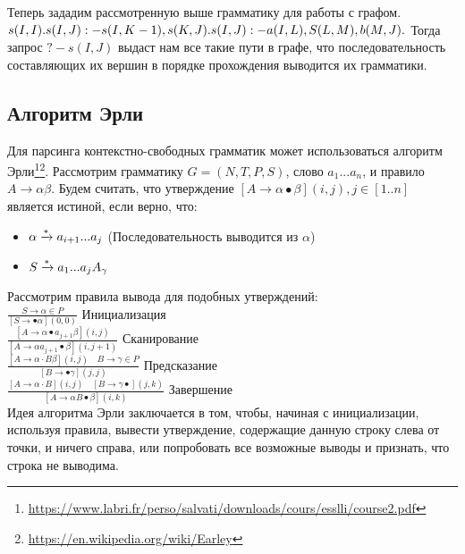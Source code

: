 Теперь зададим рассмотренную выше грамматику для работы с графом.\\
$s(I, I).\\
s(I,J) :- s(I, K-1),s(K, J).\\
s(I, J):- a(I, L),S(L,M),b(M,J).\\$
Тогда запрос $?-s(I, J)$ выдаст нам все такие пути в графе, что последовательность составляющих их вершин в порядке прохождения выводится их грамматики.\\

\subsection{Алгоритм Эрли}
Для парсинга контекстно-свободных грамматик может использоваться алгоритм Эрли\footnote{\url{https://www.labri.fr/perso/salvati/downloads/cours/esslli/course2.pdf}}\footnote{\url{https://en.wikipedia.org/wiki/Earley}}.
Рассмотрим грамматику $G=(N,T,P,S)$, слово $a_1...a_n$,
и правило $A \rightarrow \alpha\beta$. Будем считать, что утверждение
$[A\rightarrow \alpha \bullet \beta](i,j), j \in [1..n]$ является истиной, если верно, что:
\begin{itemize}
	\item $\alpha \xrightarrow{\smash{*}} a_{i+1}...a_j$ (Последовательность выводится из $\alpha$)
	\item $S \xrightarrow{\smash{*}} a_1...a_jA_\gamma$ 
\end{itemize}


Рассмотрим правила вывода для подобных утверждений:\\

$\frac{S \rightarrow \alpha \in P}{[S \rightarrow \bullet \alpha](0,0)}$ Инициализация\\

$\frac{\left[A \rightarrow \alpha \bullet a_{j+1} \beta\right](i, j)}{\left[A \rightarrow \alpha a_{j+1} \bullet \beta\right](i, j+1)}$ Сканирование\\

$\frac{[A \rightarrow \alpha \cdot B \beta](i, j) \quad B \rightarrow \gamma \in P}{[B \rightarrow \bullet \gamma](j, j)}$ Предсказание\\

$\frac{[A \rightarrow \alpha \cdot B](i, j) \quad[B \rightarrow \gamma \bullet](j, k)}{[A \rightarrow \alpha B \bullet \beta](i, k)}$ Завершение\\

Идея алгоритма Эрли заключается в том, чтобы, начиная с инициализации, используя правила, вывести утверждение, содержащие данную строку слева от точки, и ничего справа, или попробовать все возможные выводы и признать, что строка не выводима.

